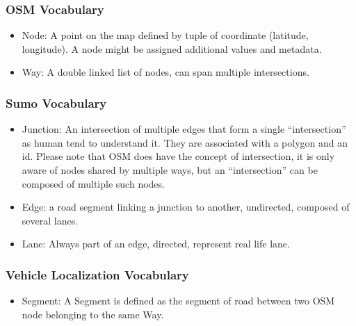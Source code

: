 \documentclass[letterpaper,10pt,english]{sphinxmanual}
\begin{document}
\subsubsection{OSM Vocabulary}
\label{\detokenize{microservices/vehicle_localization/vocabulary:osm-vocabulary}}\begin{itemize}
\item {} 
Node: A point on the map defined by tuple of coordinate (latitude, longitude).
A node might be assigned additional values and metadata.

\item {} 
Way: A double linked list of nodes, can span multiple intersections.

\end{itemize}


\subsubsection{Sumo Vocabulary}
\label{\detokenize{microservices/vehicle_localization/vocabulary:sumo-vocabulary}}\begin{itemize}
\item {} 
Junction: An intersection of multiple edges that form a single “intersection” as human tend to understand it.
They are associated with a polygon and an id.
Please note that OSM does  have the concept of intersection, it is only aware of nodes shared by multiple ways, but an “intersection” can be composed of multiple such nodes.

\item {} 
Edge: a road segment linking a junction to another, undirected, composed of several lanes.

\item {} 
Lane: Always part of an edge, directed, represent real life lane.

\end{itemize}


\subsubsection{Vehicle Localization Vocabulary}
\label{\detokenize{microservices/vehicle_localization/vocabulary:vehicle-localization-vocabulary}}\begin{itemize}
\item {} 
Segment: A Segment is defined as the segment of road between two OSM node belonging to the same Way.

\end{itemize}
\end{document}
